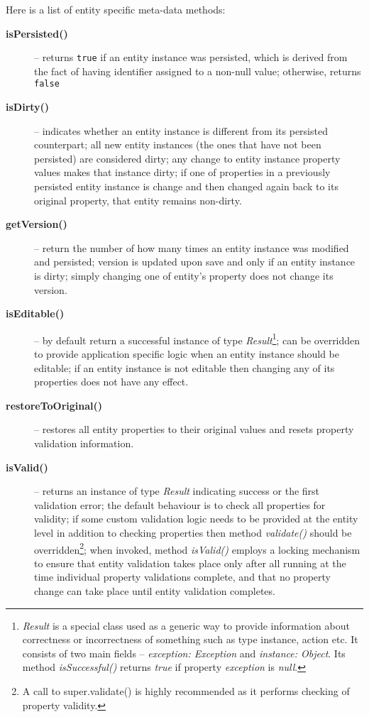   Here is a list of entity specific meta-data methods:

  \begin{description}
    \item[\textbf{isPersisted()}] -- returns \texttt{true} if an entity instance was persisted, which is derived from the fact of having identifier assigned to a non-null value; otherwise, returns \texttt{false}
    \item[\textbf{isDirty()}] -- indicates whether an entity instance is different from its persisted counterpart; all new entity instances (the ones that have not been persisted) are considered dirty; any change to entity instance property values makes that instance dirty; if one of properties in a previously persisted entity instance is change and then changed again back to its original property, that entity remains non-dirty.
    \item[\textbf{getVersion()}] -- return the number of how many times an entity instance was modified and persisted; version is updated upon save and only if an entity instance is dirty; simply changing one of entity's property does not change its version.
    \item[\textbf{isEditable()}] -- by default return a successful instance of type \emph{Result}\footnote{\emph{Result} is a special class used as a generic way to provide information about correctness or incorrectness of something such as type instance, action etc. It consists of two main fields -- \emph{exception: Exception} and \emph{instance: Object}. Its method \emph{isSuccessful()} returns \emph{true} if property \emph{exception} is \emph{null}.}; can be overridden to provide application specific logic when an entity instance should be editable; if an entity instance is not editable then changing any of its properties does not have any effect.
    \item[\textbf{restoreToOriginal()}] -- restores all entity properties to their original values and resets property validation information.
    \item[\textbf{isValid()}] -- returns an instance of type \emph{Result} indicating success or the first validation error; the default behaviour is to check all properties for validity; if some custom validation logic needs to be provided at the entity level in addition to checking properties then method \emph{validate()} should be overridden\footnote{A call to super.validate() is highly recommended as it performs checking of property validity.}; when invoked, method \emph{isValid()} employs a locking mechanism to ensure that entity validation takes place only after all running at the time individual property validations complete, and that no property change can take place until entity validation completes.
  \end{description}
  

